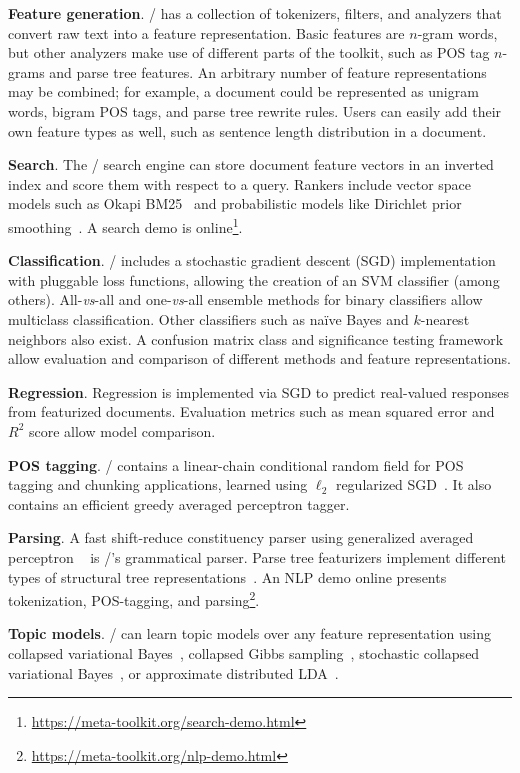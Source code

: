 \textbf{Feature generation}.
\meta/ has a collection of tokenizers, filters, and analyzers that convert raw
text into a feature representation. Basic features are $n$-gram words, but other
analyzers make use of different parts of the toolkit, such as POS tag $n$-grams
and parse tree features. An arbitrary number of feature representations may be
combined; for example, a document could be represented as unigram words, bigram
POS tags, and parse tree rewrite rules. Users can easily add their own feature
types as well, such as sentence length distribution in a document.

\textbf{Search}.
The \meta/ search engine can store document feature vectors in an inverted index
and score them with respect to a query. Rankers include vector space models such
as Okapi BM25~\cite{bm25} and probabilistic models like Dirichlet prior
smoothing~\cite{zhai-lm}. A search demo is
online\footnote{\url{https://meta-toolkit.org/search-demo.html}}.

\textbf{Classification}.
\meta/ includes a stochastic gradient descent (SGD) implementation with
pluggable loss functions, allowing the creation of an SVM classifier (among
others). All-\emph{vs}-all and one-\emph{vs}-all ensemble methods for binary
classifiers allow multiclass classification. Other classifiers such as na{\"i}ve
Bayes and $k$-nearest neighbors also exist. A confusion matrix class and
significance testing framework allow evaluation and comparison of different
methods and feature representations.

\textbf{Regression}.
Regression is implemented via SGD to predict real-valued responses from
featurized documents. Evaluation metrics such as mean squared error and $R^2$
score allow model comparison.

\textbf{POS tagging}.
\meta/ contains a linear-chain conditional random field for POS tagging and
chunking applications, learned using $\ell_2$ regularized SGD~\cite{crf}. It
also contains an efficient greedy averaged perceptron tagger.

\textbf{Parsing}.
A fast shift-reduce constituency parser using generalized averaged perceptron
~\cite{const-parsing} is \meta/'s grammatical parser. Parse tree featurizers
implement different types of structural tree representations~\cite{structural}.
An NLP demo online presents tokenization, POS-tagging, and
parsing\footnote{\url{https://meta-toolkit.org/nlp-demo.html}}.

\textbf{Topic models}.
\meta/ can learn topic models over any feature representation using collapsed
variational Bayes~\cite{cvb}, collapsed Gibbs sampling~\cite{gibbs}, stochastic
collapsed variational Bayes~\cite{scvb}, or approximate distributed
LDA~\cite{pargibbs}.

